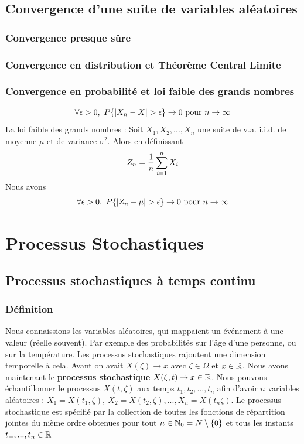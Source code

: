 \documentclass[11pt,a4paper]{article}
\numberwithin{equation}{section}
\begin{document}
\subsection{Convergence d'une suite de variables aléatoires}
\subsubsection{Convergence presque sûre}
\subsubsection{Convergence en distribution et Théorème Central Limite}
\subsubsection{Convergence en probabilité et loi faible des grands nombres}
\[\forall \epsilon > 0,\ P\{|X_n - X| > \epsilon\} \to 0 \pour \ninf\]
La loi faible des grands nombres : Soit $X_1,X_2,...,X_n$ une suite de v.a. i.i.d. de moyenne $\mu$ et de variance $\sigma^2$. Alors en définissant
\[Z_n = \frac{1}{n}\somme{n}{i=1}X_i\]
Nous avons
\[\forall \epsilon > 0,\ P\{|Z_n - \mu| > \epsilon\} \to 0 \pour \ninf\]

\section{Processus Stochastiques}
\subsection{Processus stochastiques à temps continu}
\subsubsection{Définition}
Nous connaissions les variables aléatoires, qui mappaient un événement à une valeur (réelle souvent). Par exemple des probabilités sur l'âge d'une personne, ou sur la température. Les processus stochastiques rajoutent une dimension temporelle à cela. Avant on avait $X(\zeta) \to x$ avec $\zeta \in \Omega$ et $x \in \R$. Nous avons maintenant le \textbf{processus stochastique} $X(\zeta, t) \to x\in \R$. Nous pouvons échantillonner le processus $X(t,\zeta)$ aux temps $t_1,t_2,...,t_n$ afin d'avoir $n$ variables aléatoires : $X_1 = X(t_1,\zeta),\ X_2 = X(t_2,\zeta),...,X_n = X(t_n\zeta)$. Le processus stochastique est spécifié par la collection de toutes les fonctions de répartition jointes du nième ordre obtenues pour tout $n \in \N_0 = N \setminus \{0\}$ et tous les instants $t_+,...,t_n \in \R$
\end{document}
